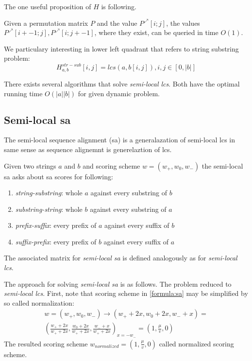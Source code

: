 The one useful proposition of $H$ is following.
\begin{proposition}\cite{}
Given a permutation matrix $P$ and the value
$P^{\nearrow}[i; j]$, the values $P^{\nearrow}[i +- 1; j], P^{\nearrow}[i; j +- 1]$, where they exist, can
be queried in time $O(1)$\cite{}.
\end{proposition}


We particulary interesting in lower left quadrant that refers to string substring problem:
\begin{equation}
H_{a,b}^{str-sub}[i,j] = lcs(a,b[i,j]),i,j \in [0,|b|] 
\end{equation}

There exists several algorithms  that solve \emph{semi-local lcs}.
Both have the optimal running time $O(|a||b|)$ for given dynamic problem\cite{}.

\subsection{Semi-local sa}
The semi-local sequence alignment (sa) is a generalazation of semi-local lcs in same sense as sequence alignemnt is generelaztion of lcs.

Given two strings $a$ and $b$ and scoring scheme $w=(w_{+},w_{0},w_{-})$  the semi-local sa  asks about
sa scores for following:
\begin{enumerate}
\item \emph{string-substring}: whole $a$ against every substring of $b$
\item \emph{substring-string}: whole $b$ against every substring of $a$
\item \emph{prefix-suffix}: every prefix of $a$ against every suffix of $b$
\item \emph{suffix-prefix}: every prefix of $b$ against every suffix of $a$
\end{enumerate} 

The associated matrix for \emph{semi-local sa} is defined analogously as for \emph{semi-local lcs}.

The approach for solving \emph{semi-local sa} is as follows.
The problem reduced to \emph{semi-local lcs}.
First, note that scoring scheme in \ref{formula:sa}
may be simplified by so called normalization\cite{}:
\begin{equation}\label{weightNormalization}
    \begin{aligned}
    w = (w_{+}, w_{0} , w_{-}) \xrightarrow{} (w_{+} +2x , w_{0} + 2x , w_{-} + x) =\\ ( \frac{w_{+} +2x}{w_{+} +2x} , \frac {w_{0} + 2x}{w_{+} +2x} , \frac{w_{-} + x}{w_{+} +2x})_{x=-w_{-}} = (1,\frac{\mu}{v} ,0) 
    \end{aligned}
\end{equation}
The resulted scoring scheme $w_{normalized} = (1,\frac{\mu}{v} ,0)$ called normalized scoring scheme.

